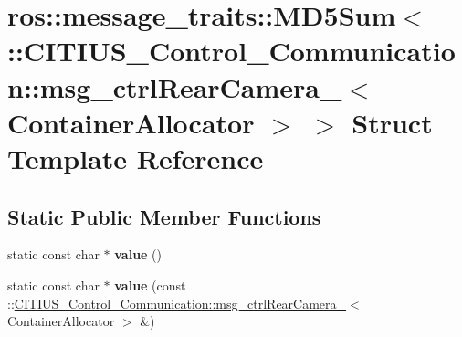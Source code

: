 \hypertarget{structros_1_1message__traits_1_1_m_d5_sum_3_01_1_1_c_i_t_i_u_s___control___communication_1_1msg_aca767840f69c3eb335ebacf2642e346}{\section{ros\-:\-:message\-\_\-traits\-:\-:\-M\-D5\-Sum$<$ \-:\-:\-C\-I\-T\-I\-U\-S\-\_\-\-Control\-\_\-\-Communication\-:\-:msg\-\_\-ctrl\-Rear\-Camera\-\_\-$<$ \-Container\-Allocator $>$ $>$ \-Struct \-Template \-Reference}
\label{structros_1_1message__traits_1_1_m_d5_sum_3_01_1_1_c_i_t_i_u_s___control___communication_1_1msg_aca767840f69c3eb335ebacf2642e346}
}
\subsection*{\-Static \-Public \-Member \-Functions}
\begin{DoxyCompactItemize}
\item 
\hypertarget{structros_1_1message__traits_1_1_m_d5_sum_3_01_1_1_c_i_t_i_u_s___control___communication_1_1msg_aca767840f69c3eb335ebacf2642e346_a3399ab9f838cdaa5ebc7b9b021a95515}{static const char $\ast$ {\bfseries value} ()}\label{structros_1_1message__traits_1_1_m_d5_sum_3_01_1_1_c_i_t_i_u_s___control___communication_1_1msg_aca767840f69c3eb335ebacf2642e346_a3399ab9f838cdaa5ebc7b9b021a95515}

\item 
\hypertarget{structros_1_1message__traits_1_1_m_d5_sum_3_01_1_1_c_i_t_i_u_s___control___communication_1_1msg_aca767840f69c3eb335ebacf2642e346_aeb5e50df6b2357ad13cd3adab9098212}{static const char $\ast$ {\bfseries value} (const \-::\hyperlink{struct_c_i_t_i_u_s___control___communication_1_1msg__ctrl_rear_camera__}{\-C\-I\-T\-I\-U\-S\-\_\-\-Control\-\_\-\-Communication\-::msg\-\_\-ctrl\-Rear\-Camera\-\_\-}$<$ \-Container\-Allocator $>$ \&)}\label{structros_1_1message__traits_1_1_m_d5_sum_3_01_1_1_c_i_t_i_u_s___control___communication_1_1msg_aca767840f69c3eb335ebacf2642e346_aeb5e50df6b2357ad13cd3adab9098212}

\end{DoxyCompactItemize}
